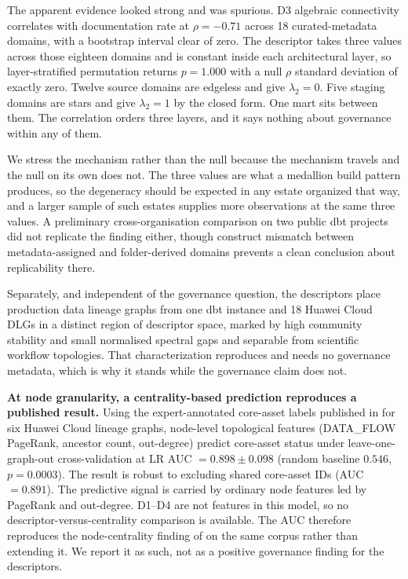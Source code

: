 \documentclass[11pt,a4paper]{article}
\begin{document}
The apparent evidence looked strong and was spurious. D3
algebraic connectivity correlates with documentation rate at $\rho =
-0.71$ across 18 curated-metadata domains, with a bootstrap interval
clear of zero. The descriptor takes three values across those eighteen
domains and is constant inside each architectural layer, so
layer-stratified permutation returns $p = 1.000$ with a null $\rho$
standard deviation of exactly zero. Twelve source domains are edgeless
and give $\lambda_2 = 0$. Five staging domains are stars and give
$\lambda_2 = 1$ by the closed form. One mart sits between them. The
correlation orders three layers, and it says nothing about governance
within any of them.

We stress the mechanism rather than the null because the mechanism
travels and the null on its own does not. The three values are what a
medallion build pattern produces, so the degeneracy should be expected
in any estate organized that way, and a larger sample of such estates
supplies more observations at the same three values. A preliminary
cross-organisation comparison on two public dbt projects did not
replicate the finding either, though construct mismatch between
metadata-assigned and folder-derived domains prevents a clean
conclusion about replicability there.

Separately, and independent of the governance question, the descriptors
place production data lineage graphs from one dbt instance and 18 Huawei
Cloud DLGs in a distinct region of descriptor space, marked by high
community stability and small normalised spectral gaps and separable
from scientific workflow topologies. That characterization reproduces
and needs no governance metadata, which is why it stands while the
governance claim does not.

\textbf{At node granularity, a centrality-based prediction reproduces a
published result.} Using the expert-annotated core-asset labels
published in \citep{chen2024dlgdg} for six Huawei Cloud lineage graphs,
node-level topological features (DATA\_FLOW PageRank, ancestor count,
out-degree) predict core-asset status under leave-one-graph-out
cross-validation at LR AUC $= 0.898 \pm 0.098$ (random baseline
$0.546$, $p = 0.0003$). The result is robust to excluding shared
core-asset IDs (AUC $= 0.891$). The predictive signal is carried by
ordinary node features led by PageRank and out-degree. D1--D4 are not
features in this model, so no descriptor-versus-centrality comparison is
available. The AUC therefore reproduces the node-centrality finding of
\citet{chen2023centrality} on the same corpus rather than extending it.
We report it as such, not as a positive governance finding for the
descriptors.
\end{document}
